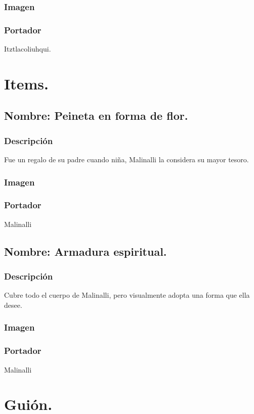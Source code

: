 \documentclass[11pt,letterpaper]{article}
\begin{document}
\subsubsection{Imagen}
\subsubsection{Portador}
Itztlacoliuhqui.



\section{Items.}
	\subsection{Nombre: Peineta en forma de flor.}
	\subsubsection{Descripción}
	Fue un regalo de su padre cuando niña, Malinalli la considera su mayor tesoro.
	\subsubsection{Imagen}
	\subsubsection{Portador}
	Malinalli 

	\subsection{Nombre: Armadura espiritual.}
	\subsubsection{Descripción}
	Cubre todo el cuerpo de Malinalli, pero visualmente adopta una forma que ella desee.
	\subsubsection{Imagen}
	\subsubsection{Portador}
	Malinalli 

\section{Guión.}
\end{document}
